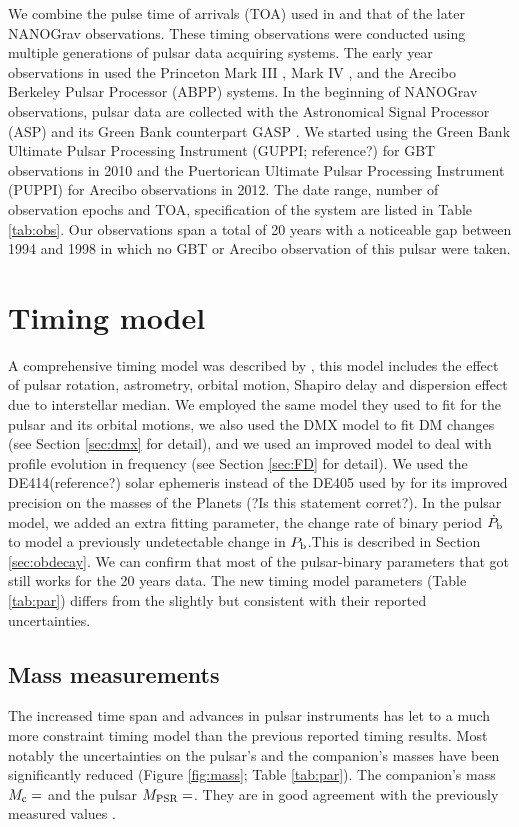 We combine the pulse time of arrivals (TOA) used in \citealt{sns+05} and that
of the later NANOGrav observations. These timing observations were conducted 
using multiple generations of pulsar data acquiring systems. The early year
observations in \citet{sns+05} used
 the Princeton Mark III \citep{skn+92}, Mark IV
\citep{sst+00}, and the Arecibo Berkeley Pulsar Processor (ABPP) systems. 
In the beginning of NANOGrav observations, pulsar data are collected with the Astronomical Signal
Processor (ASP) and its Green Bank counterpart GASP \citep{dem07}. We
started using 
the Green Bank Ultimate Pulsar Processing Instrument (GUPPI; reference?) for GBT 
observations in 2010 and the Puertorican Ultimate Pulsar Processing Instrument
(PUPPI) for Arecibo observations in 2012. 
The date range, number of observation epochs and TOA, specification of the
system are listed in Table \ref{tab:obs}.
Our observations span a total of 20 years with a noticeable gap between 1994
and 1998 in which no GBT or Arecibo observation of this pulsar were taken. 


\section{Timing model}
\label{sec:model}
A comprehensive timing model was described by \citet{sns+05}, this model includes the effect of pulsar rotation, astrometry, orbital motion, Shapiro delay and dispersion effect due to interstellar median.
We employed the same \citet{dd86} model they used to fit for the pulsar and
its orbital motions, we also used the DMX model to fit DM changes (see Section
\ref{sec:dmx} for detail), and we used an improved model to deal with profile
evolution in frequency (see Section \ref{sec:FD} for detail). 
We used the DE414(reference?) solar ephemeris instead of the DE405 used by
\citet{sns+05} for its improved precision on the masses of the Planets (?Is this
statement corret?).
In the pulsar model, we added an extra fitting parameter, the change rate of binary period $\dot{P}_{\rm b}$ to model a previously undetectable change in $P_{\rm b}$.This is described in Section \ref{sec:obdecay}.    
We can confirm that most of the pulsar-binary parameters that \citet{sns+05} got still works for the 20 years data. The new timing model parameters (Table \ref{tab:par}) differs from the \citet{sns+05} slightly but consistent with their reported uncertainties.

\subsection{Mass measurements}
\label{sec:mass}
The increased time span and advances in pulsar instruments has let to a much
more constraint timing model than the previous reported timing results. Most
notably the uncertainties on the pulsar's and the companion's masses have been
significantly reduced (Figure \ref{fig:mass}; Table \ref{tab:par}). The
companion's mass $M_{\rm c} = $ and the pulsar $M_{\rm PSR}=$. They are in
good agreement with the previously measured values \cite{sns+05}.

